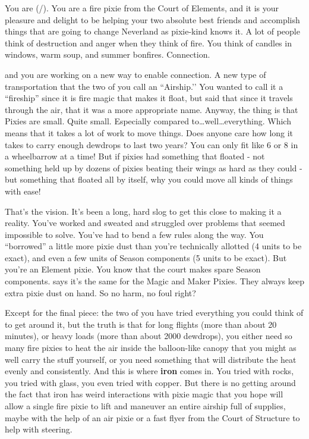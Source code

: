 \documentclass[char]{PP}
\begin{document}
\name{\cEAirship{}}

You are \cEAirship{} (\cEAirship{\They}/\cEAirship{\Them}). You are a fire pixie from the Court of Elements, and it is your pleasure and delight to be helping your two absolute best friends \cMAirship{} and \cFTitan{} accomplish things that are going to change Neverland as pixie-kind knows it. A lot of people think of destruction and anger when they think of fire. You think of candles in windows, warm soup, and summer bonfires. Connection.

\cMAirship{} and you are working on a new way to enable connection. A new type of transportation that the two of you call an ``Airship.'’ You wanted to call it a “fireship” since it is fire magic that makes it float, but \cMAirship{} said that since it travels through the air, that it was a more appropriate name. Anyway, the thing is that Pixies are small. Quite small. Especially compared to\ldots{}well\ldots{}everything. Which means that it takes a lot of work to move things. Does anyone care how long it takes to carry enough dewdrops to last two years? You can only fit like 6 or 8 in a wheelbarrow at a time! But if pixies had something that floated - not something held up by dozens of pixies beating their wings as hard as they could - but something that floated all by itself, why you could move all kinds of things with ease!

That's the vision. It's been a long, hard slog to get this close to making it a reality. You've worked and sweated and struggled over problems that seemed impossible to solve. You've had to bend a few rules along the way. You “borrowed” a little more pixie dust than you're technically allotted (4 units to be exact), and even a few units of Season components (5 units to be exact). But you're an Element pixie. You know that the court makes spare Season components. \cMAirship{} says it's the same for the Magic and Maker Pixies. They always keep extra pixie dust on hand. So no harm, no foul right? 

Except for the final piece: the two of you have tried everything you could think of to get around it, but the truth is that for long flights (more than about 20 minutes), or heavy loads (more than about 2000 dewdrops), you either need so many fire pixies to heat the air inside the balloon-like canopy that you might as well carry the stuff yourself, or you need something that will distribute the heat evenly and consistently. And this is where \textbf{iron} comes in. You tried with rocks, you tried with glass, you even tried with copper. But there is no getting around the fact that iron has weird interactions with pixie magic that you hope will allow a single fire pixie to lift and maneuver an entire airship full of supplies, maybe with the help of an air pixie or a fast flyer from the Court of Structure to help with steering.
\end{document}
